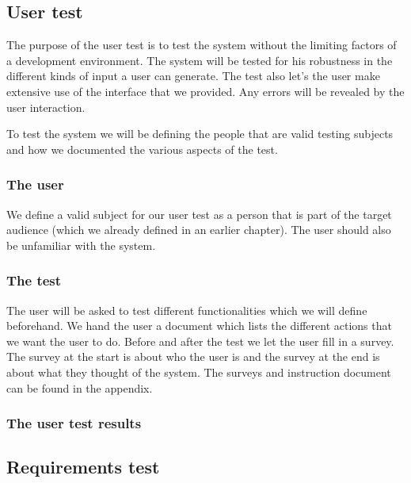 \subsection{User test}
The purpose of the user test is to test the system without the limiting factors of a development environment.
The system will be tested for his robustness in the different kinds of input a user can generate.
The test also let's the user make extensive use of the interface that we provided.
Any errors will be revealed by the user interaction.

To test the system we will be defining the people that are valid testing subjects and how we documented the various aspects of the test.

\subsubsection{The user}
We define a valid subject for our user test as a person that is part of the target audience (which we already defined in an earlier chapter).
The user should also be unfamiliar with the system.

\subsubsection{The test}
The user will be asked to test different functionalities which we will define beforehand.
We hand the user a document which lists the different actions that we want the user to do.
Before and after the test we let the user fill in a survey.
The survey at the start is about who the user is and the survey at the end is about what they thought of the system.
The surveys and instruction document can be found in the appendix.

\subsubsection{The user test results}

\subsection{Requirements test}


